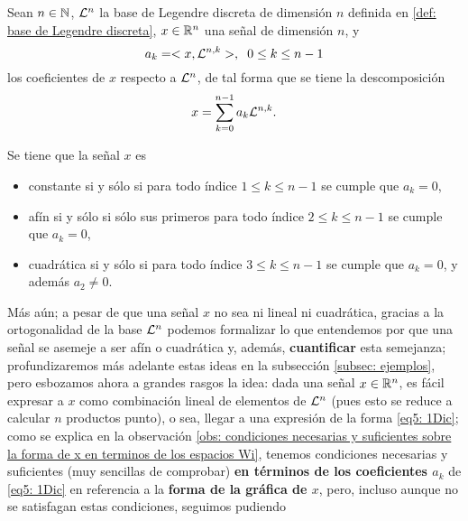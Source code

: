 \begin{obs} 
\label{obs: condiciones necesarias y suficientes sobre la forma de x en terminos de los espacios Wi}
Sean $n \in \mathbb{N}$, $\mathcal{L}^{n}$
la base de Legendre discreta de dimensión $n$
definida en 
\ref{def: base de Legendre discreta}, 
$x \in \mathbb{R}^{n}$ una señal de dimensión $n$, y
\[
a_{k}=<x, \mathcal{L}^{n,k}>, \hspace{0.2cm} 0 \leq k \leq n-1
\]
los coeficientes de $x$
respecto
a $\mathcal{L}^{n}$,
de tal forma que se tiene la descomposición
\begin{equation}
\label{eq5: 1Dic}
x=\sum\limits_{k=0}^{n-1}a_{k}\mathcal{L}^{n,k}.
\end{equation}


Se tiene que la señal $x$ es
 
\begin{itemize}
\item constante si y sólo si para todo índice
$1 \leq k \leq n-1$ se cumple que $a_{k}=0$,

\item afín si y sólo si sólo sus primeros
para todo índice
$2 \leq k \leq n-1$ se cumple que $a_{k}=0$,

\item cuadrática si y sólo si 
para todo índice
$3 \leq k \leq n-1$ se cumple que $a_{k}=0$,
y además $a_{2} \neq 0$.
\end{itemize}
\end{obs}

Más aún; a pesar de que
una señal $x$ no sea ni lineal ni cuadrática, gracias a la 
ortogonalidad de la base
$\mathcal{L}^{n}$ podemos formalizar lo que
entendemos por que una señal se asemeje a ser
afín o cuadrática y, además, \textbf{cuantificar} esta semejanza;
profundizaremos más adelante estas ideas
en la subsección \ref{subsec: ejemplos},
pero esbozamos ahora a grandes rasgos la idea:
dada una señal $x \in \mathbb{R}^{n}$, es fácil expresar
a $x$ como combinación lineal
de elementos de $\mathcal{L}^{n}$ 
(pues esto se reduce a calcular $n$ productos punto),
o sea, llegar a una expresión de la forma
\eqref{eq5: 1Dic}; como se explica en 
la observación 
\ref{obs: condiciones necesarias y suficientes sobre la forma de x en terminos de los espacios Wi}, tenemos condiciones necesarias y suficientes
(muy sencillas de comprobar)
\textbf{en términos de los coeficientes $a_{k}$}
de \eqref{eq5: 1Dic} en referencia a la \textbf{forma
de la gráfica de $x$}, pero, incluso aunque no se satisfagan
estas condiciones,
seguimos pudiendo  


